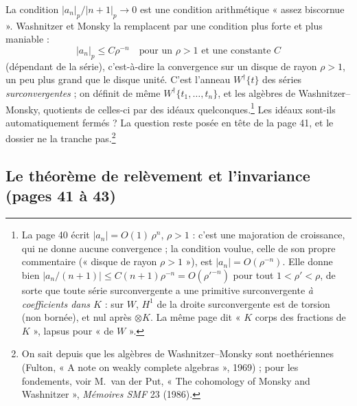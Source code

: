 \documentclass[11pt,a4paper]{article}
\begin{document}
La condition $|a_n|_p / |n+1|_p \to 0$ est une condition arithmétique
« assez biscornue ». Washnitzer et Monsky la remplacent par une condition plus
forte et plus maniable :
\[
  |a_n|_p \leq C \rho^{-n} \quad \text{pour un } \rho > 1
  \text{ et une constante } C
\]
(dépendant de la série), c'est-à-dire la convergence sur un disque de rayon
$\rho > 1$, un peu plus grand que le disque unité. C'est l'anneau
$W^{\dagger}\{t\}$ des séries \emph{surconvergentes} ; on définit de même
$W^{\dagger}\{t_1, \ldots, t_n\}$, et les algèbres de Washnitzer--Monsky,
quotients de celles-ci par des idéaux quelconques.\footnote{La page 40 écrit
$|a_n| = O(1)\,\rho^{n}$, $\rho > 1$ : c'est une majoration de croissance, qui
ne donne aucune convergence ; la condition voulue, celle de son propre
commentaire (« disque de rayon $\rho > 1$ »), est $|a_n| = O(\rho^{-n})$. Elle
donne bien $|a_n/(n+1)| \leq C (n+1) \rho^{-n} = O(\rho'^{-n})$ pour tout
$1 < \rho' < \rho$, de sorte que toute série surconvergente a une primitive
surconvergente \emph{à coefficients dans $K$} : sur $W$, $H^{1}$ de la droite
surconvergente est de torsion (non bornée), et nul après $\otimes K$. La même
page dit « $K$ corps des fractions de $K$ », lapsus pour « de $W$ ».} Les
idéaux sont-ils automatiquement fermés ? La question reste posée en tête de
la page 41, et le dossier ne la tranche pas.\footnote{On sait depuis que les
algèbres de Washnitzer--Monsky sont noethériennes (Fulton, « A note on weakly
complete algebras », 1969) ; pour les fondements, voir M.~van der Put,
« The cohomology of Monsky and Washnitzer », \emph{Mémoires SMF} 23 (1986).}

\subsection*{Le théorème de relèvement et l'invariance (pages 41 à 43)}
\end{document}
